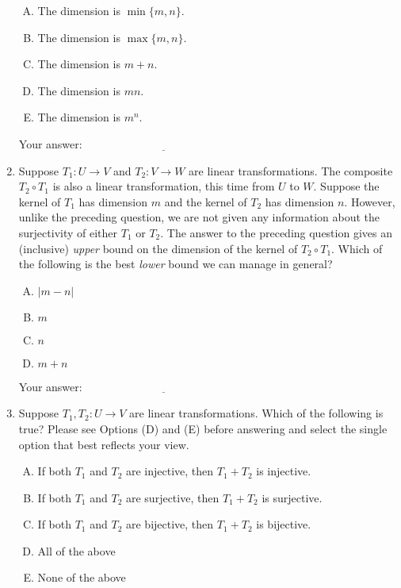 \documentclass[10pt]{amsart}
\begin{document}
\begin{enumerate}
  \begin{enumerate}[(A)]
  \item The dimension is $\min \{ m,n \}$.
  \item The dimension is $\max \{ m,n \}$.
  \item The dimension is $m + n$.
  \item The dimension is $mn$.
  \item The dimension is $m^n$.
  \end{enumerate}

  \vspace{0.1in}
  Your answer: $\underline{\qquad\qquad\qquad\qquad\qquad\qquad\qquad}$
  \vspace{0.1in}

\item Suppose $T_1: U \to V$ and $T_2:V \to W$ are linear
  transformations. The composite $T_2 \circ T_1$ is also a linear
  transformation, this time from $U$ to $W$. Suppose the kernel of
  $T_1$ has dimension $m$ and the kernel of $T_2$ has dimension
  $n$. However, unlike the preceding question, we are not given any
  information about the surjectivity of either $T_1$ or $T_2$. The
  answer to the preceding question gives an (inclusive) {\em upper}
  bound on the dimension of the kernel of $T_2 \circ T_1$. Which of
  the following is the best {\em lower} bound we can manage in
  general?

  \begin{enumerate}[(A)]
  \item $|m - n|$
  \item $m$
  \item $n$
  \item $m + n$
  \end{enumerate}

  \vspace{0.1in}
  Your answer: $\underline{\qquad\qquad\qquad\qquad\qquad\qquad\qquad}$
  \vspace{0.1in}

\item Suppose $T_1,T_2:U \to V$ are linear transformations. Which of
  the following is true? Please see Options (D) and (E) before
  answering and select the single option that best reflects your view.

  \begin{enumerate}[(A)]
  \item If both $T_1$ and $T_2$ are injective, then $T_1 + T_2$ is injective.
  \item If both $T_1$ and $T_2$ are surjective, then $T_1 + T_2$ is surjective.
  \item If both $T_1$ and $T_2$ are bijective, then $T_1 + T_2$ is bijective.
  \item All of the above
  \item None of the above
  \end{enumerate}


\end{enumerate}
\end{document}
